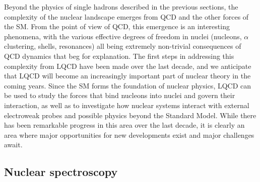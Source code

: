 
 Beyond the physics of single hadrons described in the previous sections, the complexity of the nuclear landscape emerges from QCD and the other forces of the SM.  From the point of view of QCD, this emergence is an interesting phenomena, with the various effective degrees of freedom in nuclei (nucleons, $\alpha$ clustering, shells, resonances) all being extremely non-trivial consequences of QCD dynamics that beg for explanation. The first steps in addressing this complexity from LQCD have been made over the last decade, and we anticipate that LQCD will become an increasingly important part of nuclear theory in the coming years. Since the SM forms the foundation of nuclear physics, LQCD can be used to study the forces that bind nucleons into nuclei and govern their interaction, as well as to investigate how nuclear systems interact with external electroweak probes and possible physics beyond the Standard Model.
While there has been remarkable progress in this area over the last decade, it is clearly an area where major opportunities for new developments exist and major challenges await.

\subsection{Nuclear spectroscopy}

